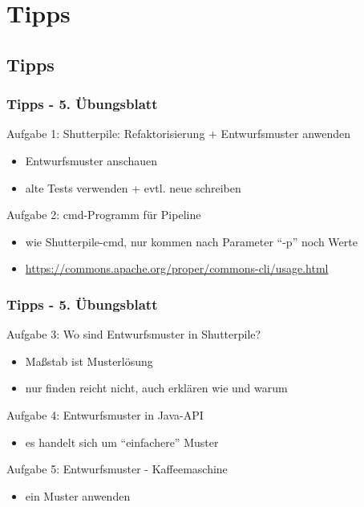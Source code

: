 \documentclass[18pt]{beamer}
\begin{document}
\section{Tipps}
	\subsection{Tipps}
	\begin{frame}
		\frametitle{Tipps - 5. Übungsblatt}
			\begin{exampleblock}{Aufgabe 1: Shutterpile: Refaktorisierung + Entwurfsmuster anwenden} 
				\begin{itemize}
					\item Entwurfsmuster anschauen
					\item alte Tests verwenden + evtl. neue schreiben
				\end{itemize}
			\end{exampleblock}
			\pause
			\begin{exampleblock}{Aufgabe 2: cmd-Programm für Pipeline} 
				\begin{itemize}
					\item wie Shutterpile-cmd, nur kommen nach Parameter \enquote{-p} noch Werte
					\item \url{https://commons.apache.org/proper/commons-cli/usage.html}
				\end{itemize}
			\end{exampleblock}
	\end{frame}

	\begin{frame}
		\frametitle{Tipps - 5. Übungsblatt}
			\begin{exampleblock}{Aufgabe 3: Wo sind Entwurfsmuster in Shutterpile?}
				\begin{itemize}
					\item Maßstab ist Musterlösung
					\item nur finden reicht nicht, auch erklären wie und warum
				\end{itemize}
			\end{exampleblock}
			\pause
			\begin{exampleblock}{Aufgabe 4: Entwurfsmuster in Java-API}
				\begin{itemize}
					\item es handelt sich um \enquote{einfachere} Muster
				\end{itemize}
			\end{exampleblock}
			\pause
			\begin{exampleblock}{Aufgabe 5: Entwurfsmuster - Kaffeemaschine}
				\begin{itemize}
					\item ein Muster anwenden
				\end{itemize}
			\end{exampleblock}
	\end{frame}
	
\end{document}
